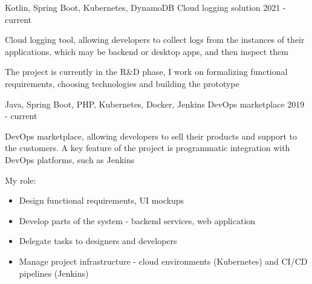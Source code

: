 

\begin{cventries}

    \cventry
    {Kotlin, Spring Boot, Kubernetes, DynamoDB}
    {Cloud logging solution}
    {}
    {2021 - current}
    {
        \begin{cvitems} %
            \item Cloud logging tool, allowing developers to collect logs from the instances of their applications, which may be backend or desktop apps, and then inspect them
            \item The project is currently in the R\&D phase, I work on formalizing functional requirements, choosing technologies and building the prototype
        \end{cvitems}
    }

    \cventry
    {Java, Spring Boot, PHP, Kubernetes, Docker, Jenkins}
    {DevOps marketplace}
    {}
    {2019 - current}
    {
        \begin{cvitems} %
            \item DevOps marketplace, allowing developers to sell their products and support to the customers. A key feature of the project is programmatic integration with DevOps platforms, such as Jenkins
            \item My role:
            \begin{itemize}[label={•},leftmargin=10pt]
                \item Design functional requirements, UI mockups
                \item Develop parts of the system - backend services, web application
                \item Delegate tasks to designers and developers
                \item Manage project infrastructure - cloud environments (Kubernetes) and CI/CD pipelines (Jenkins)
            \end{itemize}
        \end{cvitems}
    }


\end{cventries}
